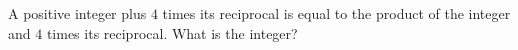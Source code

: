 A positive integer plus $4$ times its reciprocal is equal to the product of the integer and $4$ times its reciprocal. What is the integer?
